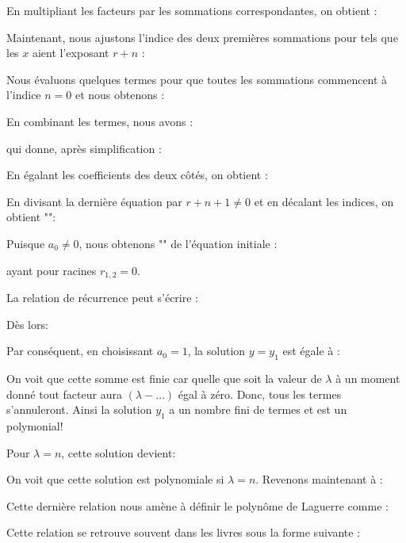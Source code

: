 	En multipliant les facteurs par les sommations correspondantes, on obtient :
	
	Maintenant, nous ajustons l'indice des deux premières sommations pour tels que les $x$ aient l'exposant $r+n$ :
	
	Nous évaluons quelques termes pour que toutes les sommations commencent à l'indice $n=0$ et nous obtenons :
	
	En combinant les termes, nous avons :
	
	qui donne, après simplification :
	
	En égalant les coefficients des deux côtés, on obtient :
	
	En divisant la dernière équation par $r+n+1 \neq 0$ et en décalant les indices, on obtient "":
	
	Puisque $a_{0} \neq 0$, nous obtenons "" de l'équation initiale :
	
	ayant pour racines $r_{1,2}=0$.
	
	La relation de récurrence peut s'écrire :
	
	Dès lors:
	
	Par conséquent, en choisissant $a_{0}=1$, la solution $y=y_{1}$ est égale à :
	
	On voit que cette somme est finie car quelle que soit la valeur de $\lambda$ à un moment donné tout facteur aura $(\lambda-\ldots)$ égal à zéro. Donc, tous les termes s'annuleront. Ainsi la solution $y_1$ a un nombre fini de termes et est un polymonial!
	
	Pour $\lambda=n$, cette solution devient:
	
	On voit que cette solution est polynomiale si $\lambda=n$. Revenons maintenant à :
	
	Cette dernière relation nous amène à définir le polynôme de Laguerre comme :
	
	Cette relation se retrouve souvent dans les livres sous la forme suivante :
	
